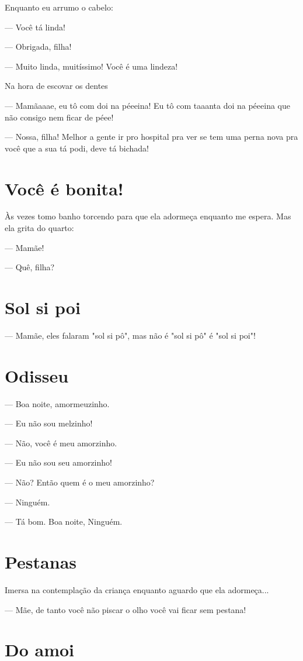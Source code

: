 Enquanto eu arrumo o cabelo:

— Você tá linda!

— Obrigada, filha!

— Muito linda, muitíssimo! Você é uma lindeza!

Na hora de escovar os dentes

— Mamãaaae, eu tô com doi na péeeina! Eu tô com taaanta doi na péeeina
que não consigo nem ficar de péee!

— Nossa, filha! Melhor a gente ir pro hospital pra ver se tem uma perna
nova pra você que a sua tá podi, deve tá bichada!

\chapter{Você é bonita!}

Às vezes tomo banho torcendo para que ela adormeça enquanto me espera.
Mas ela grita do quarto:

— Mamãe!

— Quê, filha?

\chapter{Sol si poi}

— Mamãe, eles falaram "sol si pô", mas não é "sol si pô" é "sol si poi"!

\chapter{Odisseu}

— Boa noite, amormeuzinho.

— Eu não sou melzinho!

— Não, você é meu amorzinho.

— Eu não sou seu amorzinho!

— Não? Então quem é o meu amorzinho?

— Ninguém.

— Tá bom. Boa noite, Ninguém.

\chapter{Pestanas}

Imersa na contemplação da criança enquanto aguardo que ela adormeça...

— Mãe, de tanto você não piscar o olho você vai ficar sem pestana!

\chapter{Do amoi}


